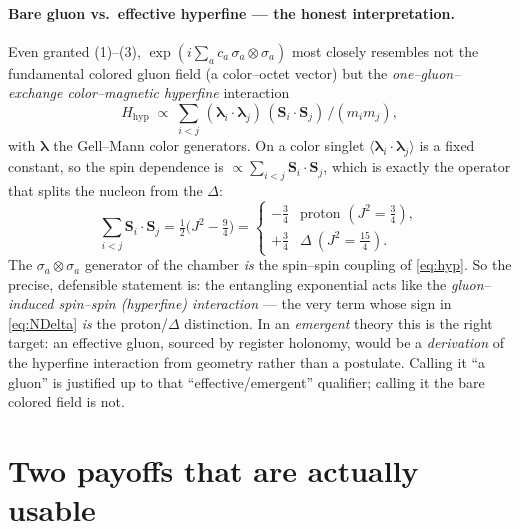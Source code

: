 \documentclass[11pt,oneside]{article}
\newcommand{\halff}{\tfrac{1}{2}}
\newcommand{\expval}[1]{\langle #1 \rangle}
\theoremstyle{plain}
\begin{document}
\paragraph{Bare gluon vs.\ effective hyperfine --- the honest interpretation.}
Even granted (1)--(3), $\exp(i\sum_a c_a\,\sigma_a\!\otimes\!\sigma_a)$ most
closely resembles not the fundamental colored gluon field (a color--octet vector)
but the \emph{one--gluon--exchange color--magnetic hyperfine} interaction
\cite{drgg}
\begin{equation}
  H_{\text{hyp}} \;\propto\; \sum_{i<j}\,
     (\bm\lambda_i\!\cdot\!\bm\lambda_j)\,
     (\bm S_i\!\cdot\!\bm S_j)\,\big/(m_i m_j),
  \label{eq:hyp}
\end{equation}
with $\bm\lambda$ the Gell--Mann color generators. On a color singlet
$\expval{\bm\lambda_i\!\cdot\!\bm\lambda_j}$ is a fixed constant, so the spin
dependence is $\propto\sum_{i<j}\bm S_i\!\cdot\!\bm S_j$, which is exactly the
operator that splits the nucleon from the $\Delta$:
\begin{equation}
  \textstyle\sum_{i<j}\bm S_i\!\cdot\!\bm S_j
   = \halff\big(J^2-\tfrac94\big)
   = \begin{cases} -\tfrac34 & \text{proton } (J^2=\tfrac34),\\[2pt]
                   +\tfrac34 & \Delta\ (J^2=\tfrac{15}{4}).\end{cases}
  \label{eq:NDelta}
\end{equation}
The $\sigma_a\!\otimes\!\sigma_a$ generator of the chamber \emph{is} the
spin--spin coupling of \eqref{eq:hyp}. So the precise, defensible statement is:
the entangling exponential acts like the \emph{gluon--induced spin--spin
(hyperfine) interaction} --- the very term whose sign in \eqref{eq:NDelta}
\emph{is} the proton/$\Delta$ distinction. In an \emph{emergent} theory this is
the right target: an effective gluon, sourced by register holonomy, would be a
\emph{derivation} of the hyperfine interaction from geometry rather than a
postulate. Calling it ``a gluon'' is justified up to that ``effective/emergent''
qualifier; calling it the bare colored field is not.

\section{Two payoffs that are actually usable}
\label{sec:payoff}
\end{document}
